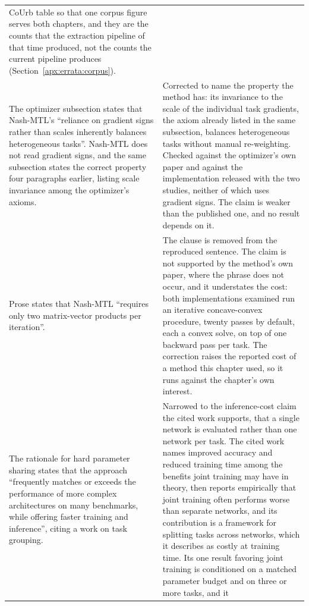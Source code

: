 {\begin{longtable}{@{}p{}p{}@{}}
CoUrb table so that one corpus figure serves both chapters, and they are the counts that the
extraction pipeline of that time produced, not the counts the current pipeline produces
(Section~\ref{apx:errata:corpus}). \\
\addlinespace
The optimizer subsection states that Nash-MTL's ``reliance on gradient signs rather than
scales inherently balances heterogeneous tasks''. Nash-MTL does not read gradient signs,
and the same subsection states the correct property four paragraphs earlier, listing
scale invariance among the optimizer's axioms. &
Corrected to name the property the method has: its invariance to the scale of the
individual task gradients, the axiom already listed in the same subsection, balances
heterogeneous tasks without manual re-weighting. Checked against the optimizer's own
paper and against the implementation released with the two studies, neither of which
uses gradient signs. The claim is weaker than the published one, and no result depends
on it. \\
\addlinespace
Prose states that Nash-MTL ``requires only two matrix-vector products per iteration''. &
The clause is removed from the reproduced sentence.
The claim is not supported by the method's own paper, where the phrase does not occur, and
it understates the cost: both implementations examined run an iterative concave-convex
procedure, twenty passes by default, each a convex solve, on top of one backward pass per
task. The correction raises the reported cost of a method this chapter used, so it runs
against the chapter's own interest. \\
\addlinespace
The rationale for hard parameter sharing states that the approach ``frequently matches or
exceeds the performance of more complex architectures on many benchmarks, while offering
faster training and inference'', citing a work on task grouping. &
Narrowed to the inference-cost claim the cited work supports, that a single network is
evaluated rather than one network per task. The
cited work names improved accuracy and reduced training time among the benefits joint
training may have in theory, then reports empirically that joint training often performs
worse than separate networks, and its contribution is a framework for splitting tasks across
networks, which it describes as costly at training time. Its one result favoring joint
training is conditioned on a matched parameter budget and on three or more tasks, and it

\end{longtable}}
